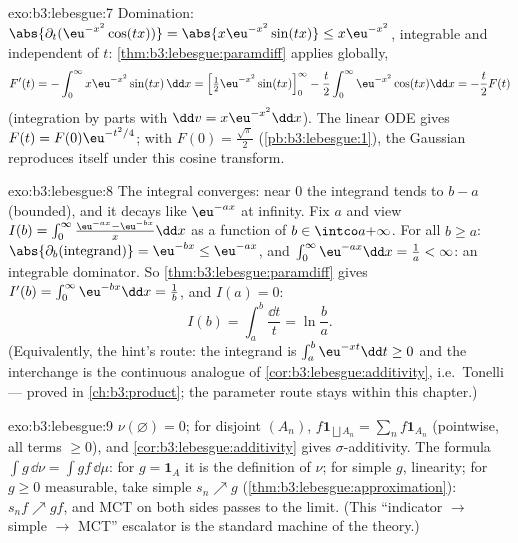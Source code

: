 \begin{solution}{exo:b3:lebesgue:7}
Domination: $\abs{\partial_t(\eu^{-x^2}\cos(tx))} =
\abs{x\eu^{-x^2}\sin(tx)} \leq x\eu^{-x^2}$, integrable and
independent of $t$: \cref{thm:b3:lebesgue:paramdiff} applies
globally,
\[
F'(t) = -\int_0^\infty x\eu^{-x^2}\sin(tx)\,\dd x
= \Bigl[\tfrac12\eu^{-x^2}\sin(tx)\Bigr]_0^\infty
- \frac t2\int_0^\infty\eu^{-x^2}\cos(tx)\dd x
= -\frac t2F(t)
\]
(integration by parts with $\dd v = x\eu^{-x^2}\dd x$). The
linear ODE gives $F(t) = F(0)\eu^{-t^2/4}$; with $F(0) =
\frac{\sqrt\pi}2$ (\cref{pb:b3:lebesgue:1}), the Gaussian
reproduces itself under this cosine transform.
\end{solution}

\begin{solution}{exo:b3:lebesgue:8}
The integral converges: near $0$ the integrand tends to $b - a$
(bounded), and it decays like $\eu^{-ax}$ at infinity. Fix $a$
and view $I(b) = \int_0^\infty\frac{\eu^{-ax} -
\eu^{-bx}}x\dd x$ as a function of $b \in \intco a{+\infty}$.
For all $b \geq a$: $\abs{\partial_b(\text{integrand})} =
\eu^{-bx} \leq \eu^{-ax}$, and $\int_0^\infty\eu^{-ax}\dd x =
\frac1a < \infty$: an integrable dominator. So
\cref{thm:b3:lebesgue:paramdiff} gives $I'(b) =
\int_0^\infty\eu^{-bx}\dd x = \frac1b$, and $I(a) = 0$:
\[
I(b) = \int_a^b\frac{\dd t}t = \ln\frac ba .
\]
(Equivalently, the hint's route: the integrand is
$\int_a^b\eu^{-xt}\dd t \geq 0$ and the interchange is the
continuous analogue of \cref{cor:b3:lebesgue:additivity},
i.e.\ Tonelli --- proved in \cref{ch:b3:product}; the
parameter route stays within this chapter.)
\end{solution}

\begin{solution}{exo:b3:lebesgue:9}
$\nu(\varnothing) = 0$; for disjoint $(A_n)$, $f\mathbf
1_{\bigsqcup A_n} = \sum_nf\mathbf 1_{A_n}$ (pointwise, all
terms $\geq 0$), and \cref{cor:b3:lebesgue:additivity} gives
$\sigma$-additivity. The formula $\int g\,\dd\nu = \int
gf\,\dd\mu$: for $g = \mathbf 1_A$ it is the definition of
$\nu$; for simple $g$, linearity; for $g \geq 0$ measurable,
take simple $s_n \nearrow g$
(\cref{thm:b3:lebesgue:approximation}): $s_nf \nearrow gf$, and
MCT on both sides passes to the limit. (This ``indicator
$\to$ simple $\to$ MCT'' escalator is the standard machine of
the theory.)
\end{solution}

